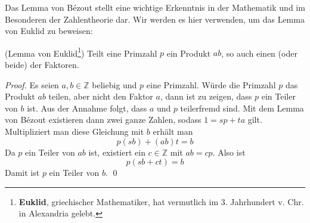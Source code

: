 Das Lemma von Bézout stellt eine wichtige Erkenntnis in der Mathematik und im Besonderen der Zahlentheorie dar. Wir werden es hier verwenden, um das Lemma von Euklid zu beweisen:

\begin{lemma}{(Lemma von Euklid\footnote{\textbf{Euklid}, griechischer Mathematiker, hat vermutlich im 3. Jahrhundert v. Chr. in Alexandria gelebt.})}
Teilt eine Primzahl $p$ ein Produkt $ab$, so auch einen (oder beide) der Faktoren.
\end{lemma}
\begin{proof}
Es seien $a,b \in \mathbb{Z}$ beliebig und $p$ eine Primzahl. Würde die Primzahl $p$ das Produkt $ab$ teilen, aber nicht den Faktor $a$, dann ist zu zeigen, dass $p$ ein Teiler von $b$ ist. Aus der Annahme folgt, dass $a$ und $p$ teilerfremd sind. Mit dem Lemma von Bézout existieren dann zwei ganze Zahlen, sodass $1=sp+ta$ gilt. Multipliziert man diese Gleichung mit $b$ erhält man
\[
p(sb)+(ab)t=b
\]
Da $p$ ein Teiler von $ab$ ist, existiert ein $c\in \mathbb{Z}$ mit $ab=cp$. Also ist
\[
p(sb+ct) = b
\]
Damit ist $p$ ein Teiler von $b$.
\qed
\end{proof}

